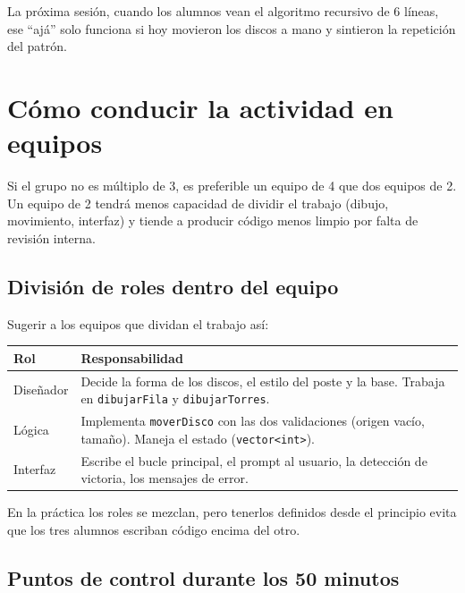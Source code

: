 \documentclass[12pt, oneside]{article}
\begin{document}
La próxima sesión, cuando los alumnos vean el algoritmo recursivo de 6 líneas,
ese ``ajá'' solo funciona si hoy movieron los discos a mano y sintieron la
repetición del patrón.

\section{Cómo conducir la actividad en equipos}

\begin{notaprofesor}
  Si el grupo no es múltiplo de 3, es preferible un equipo de 4 que dos
  equipos de 2.  Un equipo de 2 tendrá menos capacidad de dividir el
  trabajo (dibujo, movimiento, interfaz) y tiende a producir código menos
  limpio por falta de revisión interna.
\end{notaprofesor}

\subsection{División de roles dentro del equipo}

Sugerir a los equipos que dividan el trabajo así:

\begin{center}
\begin{tabular}{lp{9cm}}
  \toprule
  \textbf{Rol} & \textbf{Responsabilidad} \\
  \midrule
  Diseñador & Decide la forma de los discos, el estilo del poste y la base.
              Trabaja en \texttt{dibujarFila} y \texttt{dibujarTorres}. \\
  Lógica    & Implementa \texttt{moverDisco} con las dos validaciones
              (origen vacío, tamaño). Maneja el estado (\texttt{vector<int>}). \\
  Interfaz  & Escribe el bucle principal, el prompt al usuario, la
              detección de victoria, los mensajes de error. \\
  \bottomrule
\end{tabular}
\end{center}

En la práctica los roles se mezclan, pero tenerlos definidos desde el
principio evita que los tres alumnos escriban código encima del otro.

\subsection{Puntos de control durante los 50 minutos}
\end{document}
